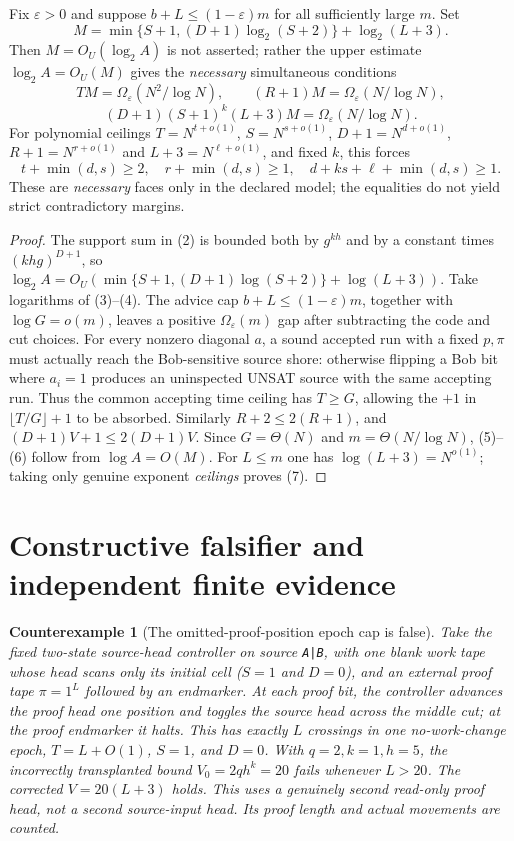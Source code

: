 \documentclass[11pt]{article}
\newtheorem{counterexample}[theorem]{Counterexample}
\begin{document}
\begin{corollary}\label{cor:face}
Fix $\varepsilon>0$ and suppose $b+L\le(1-\varepsilon)m$ for all
sufficiently large $m$. Set
\[
 M=\min\{S+1,(D+1)\log_2(S+2)\}+\log_2(L+3).
\]
Then $M=O_U(\log_2 A)$ is not asserted; rather the upper estimate
$\log_2 A=O_U(M)$ gives the \emph{necessary} simultaneous conditions
\[
  T M=\Omega_\varepsilon(N^2/\log N),\qquad
  (R+1) M=\Omega_\varepsilon(N/\log N),
\tag{5}
\]
\[
  (D+1)(S+1)^k(L+3)M
  =\Omega_\varepsilon(N/\log N).
\tag{6}
\]
For polynomial ceilings $T=N^{t+o(1)}$,
$S=N^{s+o(1)}$, $D+1=N^{d+o(1)}$,
$R+1=N^{r+o(1)}$ and $L+3=N^{\ell+o(1)}$,
and fixed $k$, this forces
\[
 \boxed{\
 t+\min(d,s)\ge2,\quad
 r+\min(d,s)\ge1,\quad
 d+ks+\ell+\min(d,s)\ge1.\ }\tag{7}
\]
These are \emph{necessary} faces only in the declared model;
the equalities do not yield strict contradictory margins.
\end{corollary}
\begin{proof}
The support sum in (2) is bounded both by $g^{kh}$ and by a
constant times $(khg)^{D+1}$, so
$\log_2 A=O_U(\min\{S+1,(D+1)\log(S+2)\}+\log(L+3))$.
Take logarithms of (3)--(4). The advice cap
$b+L\le(1-\varepsilon)m$, together with
$\log G=o(m)$, leaves a positive $\Omega_\varepsilon(m)$
gap after subtracting the code and cut choices.
For every nonzero diagonal $a$, a sound accepted run with a fixed
$p,\pi$ must actually reach the Bob-sensitive source shore:
otherwise flipping a Bob bit where $a_i=1$ produces an
uninspected UNSAT source with the same accepting run.
Thus the common accepting time ceiling has $T\ge G$,
allowing the $+1$ in $\lfloor T/G\rfloor+1$
to be absorbed. Similarly $R+2\le2(R+1)$,
and $(D+1)V+1\le2(D+1)V$.
Since $G=\Theta(N)$ and $m=\Theta(N/\log N)$,
(5)--(6) follow from $\log A=O(M)$.
For $L\le m$ one has $\log(L+3)=N^{o(1)}$;
taking only genuine exponent \emph{ceilings} proves (7).
\end{proof}

\section{Constructive falsifier and independent finite evidence}
\begin{counterexample}[The omitted-proof-position epoch cap is false]
Take the fixed two-state source-head controller on source \texttt{A|B},
with one blank work tape whose head scans only its initial cell
($S=1$ and $D=0$), and an external proof tape
$\pi=1^L$ followed by an endmarker. At each proof bit,
the controller advances the proof head one position and toggles
the source head across the middle cut; at the proof endmarker it
halts. This has \emph{exactly $L$ crossings in one no-work-change
epoch}, $T=L+O(1)$, $S=1$, and $D=0$.
With $q=2,k=1,h=5$, the incorrectly transplanted bound
$V_0=2qh^k=20$ fails whenever $L>20$.
The corrected $V=20(L+3)$ holds. This uses a genuinely
\emph{second read-only proof head}, not a second source-input
head. Its proof length and actual movements are counted.
\end{counterexample}
\end{document}
